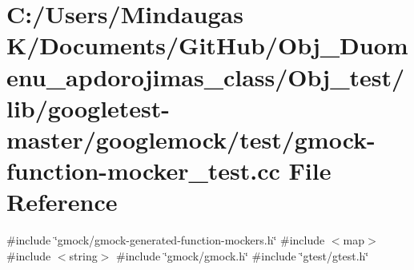 \hypertarget{_obj__test_2lib_2googletest-master_2googlemock_2test_2gmock-function-mocker__test_8cc}{}\section{C\+:/\+Users/\+Mindaugas K/\+Documents/\+Git\+Hub/\+Obj\+\_\+\+Duomenu\+\_\+apdorojimas\+\_\+class/\+Obj\+\_\+test/lib/googletest-\/master/googlemock/test/gmock-\/function-\/mocker\+\_\+test.cc File Reference}
\label{_obj__test_2lib_2googletest-master_2googlemock_2test_2gmock-function-mocker__test_8cc}
{\ttfamily \#include \char`\"{}gmock/gmock-\/generated-\/function-\/mockers.\+h\char`\"{}}\newline
{\ttfamily \#include $<$map$>$}\newline
{\ttfamily \#include $<$string$>$}\newline
{\ttfamily \#include \char`\"{}gmock/gmock.\+h\char`\"{}}\newline
{\ttfamily \#include \char`\"{}gtest/gtest.\+h\char`\"{}}\newline
